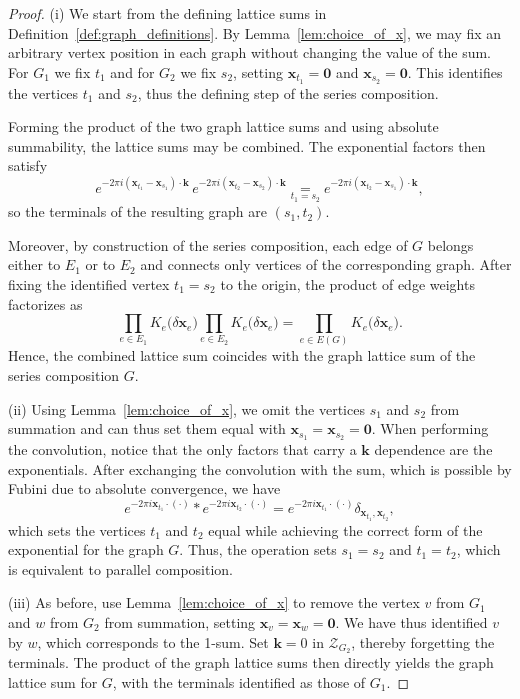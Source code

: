\documentclass[]{amsart}
\numberwithin{mythm}{section}
\begin{document}
\begin{proof}
    (i) We start from the defining lattice sums in Definition~\ref{def:graph_definitions}. 
By Lemma~\ref{lem:choice_of_x}, we may fix an arbitrary vertex position in each graph without changing the value of the sum. 
For $G_1$ we fix $t_1$ and for $G_2$ we fix $s_2$, setting
$\bm x_{t_1}=\bm 0$ and $\bm x_{s_2}=\bm 0$.
This identifies the vertices $t_1$ and $s_2$, thus the defining step of the series composition.

Forming the product of the two graph lattice sums and using absolute summability, the lattice sums may be combined. 
The exponential factors then satisfy
\[
e^{-2\pi i(\bm x_{t_1}-\bm x_{s_1})\cdot\bm k}
\,e^{-2\pi i(\bm x_{t_2}-\bm x_{s_2})\cdot\bm k}
\underset{t_1=s_2}{=}
e^{-2\pi i(\bm x_{t_2}-\bm x_{s_1})\cdot\bm k},
\]
so the terminals of the resulting graph are $(s_1,t_2)$.

Moreover, by construction of the series composition, each edge of $G$
belongs either to $E_1$ or to $E_2$ and connects only vertices of the corresponding graph.
After fixing the identified vertex $t_1=s_2$ to the origin,
the product of edge weights factorizes as
\[
\prod_{e\in E_1}
   {K}_{e}\big(\delta \bm x_{e}\big)
\prod_{e\in E_2}
   {K}_{e}\big(\delta\bm x_{e}\big)=
\prod_{e\in E(G)}
   {K}_{e}\big(\delta\bm x_{e}\big).
\]
Hence, the combined lattice sum coincides with the graph lattice sum of the series composition $G$.
    
    (ii) Using Lemma~\ref{lem:choice_of_x}, we omit the vertices $s_1$ and $s_2$ from summation and can thus set them equal with  $\bm x_{s_1}=\bm x_{s_2}=\bm 0$. When performing the convolution, notice that the only factors that carry a $\bm k$ dependence are the exponentials. After exchanging the convolution with the sum, which is possible by Fubini due to absolute convergence, we have
    \[
    e^{-2\pi i \bm x_{t_1}\cdot (\bm \cdot)} \ast e^{-2\pi i \bm x_{t_2}\cdot (\bm \cdot)} = e^{-2\pi i \bm x_{t_1}\cdot (\bm \cdot)}\delta_{\bm x_{t_1},\bm x_{t_2}},
    \]
    which sets the vertices $t_1$ and $t_2$ equal while achieving the correct form of the exponential for the graph $G$. Thus, the operation sets $s_1=s_2$ and $t_1=t_2$, which is equivalent to parallel composition.

    (iii) As before, use Lemma~\ref{lem:choice_of_x} to remove the vertex $v$ from $G_1$ and $w$ from $G_2$ from summation, setting $\bm x_{v}=\bm x_{w}=\bm 0$. We have thus identified $v$ by $w$, which corresponds to the 1-sum. Set $\bm k=0$ in $\mathcal Z_{G_2}$, thereby forgetting the terminals. The product of the graph lattice sums then directly yields the graph lattice sum for $G$, with the terminals identified as those of $G_1$. 
\end{proof}
\end{document}
